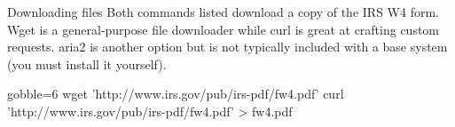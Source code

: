 \begin{block}{Downloading files}
  Both commands listed download a copy of the IRS W4 form. Wget is a general-purpose file downloader while curl is great at crafting custom requests. aria2 is another option but is not typically included with a base system (you must install it yourself).
  \begin{indented}
    \begin{bashcode*}{gobble=6}
      wget 'http://www.irs.gov/pub/irs-pdf/fw4.pdf'
      curl 'http://www.irs.gov/pub/irs-pdf/fw4.pdf' > fw4.pdf
    \end{bashcode*}
  \end{indented}
\end{block}
